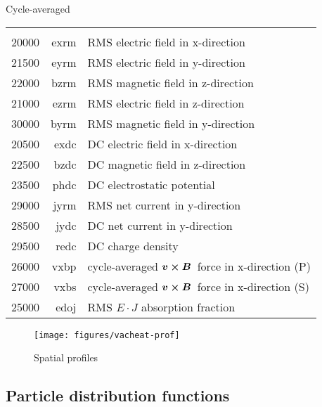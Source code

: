 \documentclass[11pt]{article}
\newcommand{\bm}[1]{\mbox{\boldmath$#1$}}
\newcommand{\vcrossb}{$\bm{v\times B}$}
\begin{document}
\noindent Cycle-averaged\\

\begin{tabular}{rrl}
\hline\\
20000 & exrm& RMS electric field in x-direction \\
21500 & eyrm& RMS electric field in y-direction \\
22000 & bzrm& RMS magnetic field in z-direction \\
21000 & ezrm& RMS electric field in z-direction \\
30000 & byrm& RMS magnetic field in y-direction \\
20500 & exdc& DC electric field in x-direction \\
22500 & bzdc& DC magnetic field in z-direction \\
23500 & phdc& DC electrostatic potential \\
29000 & jyrm& RMS net current in y-direction \\
28500 & jydc& DC net current in y-direction \\
29500 & redc& DC charge density \\
26000 & vxbp& cycle-averaged \vcrossb\ force in x-direction (P)\\
27000 & vxbs& cycle-averaged \vcrossb\ force in x-direction (S)\\
25000 & edoj& RMS \bm{E\cdot J} absorption fraction \\
\end{tabular}

\begin{figure}[ht]
\begin{center}
\texttt{[image: figures/vacheat-prof]}
\caption{Spatial profiles}
\end{center}
\end{figure}


\subsection{Particle distribution functions} 
\end{document}
